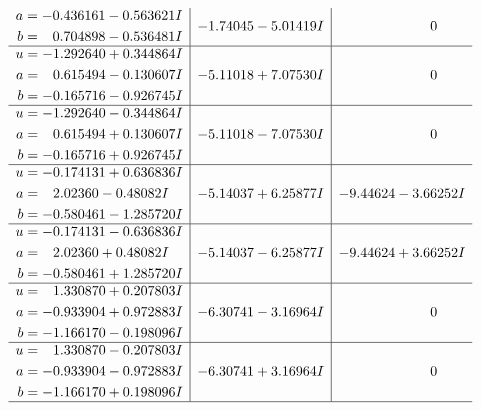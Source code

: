 \documentclass[1p]{elsarticle_modified}
\theoremstyle{definition}
\begin{document}
$$\begin{array}{c|c|c}
\begin{aligned}
a &= -0.436161 - 0.563621 I \\
b &= \phantom{-}0.704898 - 0.536481 I\end{aligned}
 & -1.74045 - 5.01419 I & \phantom{-0.000000 } 0 \\ \hline\begin{aligned}
u &= -1.292640 + 0.344864 I \\
a &= \phantom{-}0.615494 - 0.130607 I \\
b &= -0.165716 - 0.926745 I\end{aligned}
 & -5.11018 + 7.07530 I & \phantom{-0.000000 } 0 \\ \hline\begin{aligned}
u &= -1.292640 - 0.344864 I \\
a &= \phantom{-}0.615494 + 0.130607 I \\
b &= -0.165716 + 0.926745 I\end{aligned}
 & -5.11018 - 7.07530 I & \phantom{-0.000000 } 0 \\ \hline\begin{aligned}
u &= -0.174131 + 0.636836 I \\
a &= \phantom{-}2.02360 - 0.48082 I \\
b &= -0.580461 - 1.285720 I\end{aligned}
 & -5.14037 + 6.25877 I & -9.44624 - 3.66252 I \\ \hline\begin{aligned}
u &= -0.174131 - 0.636836 I \\
a &= \phantom{-}2.02360 + 0.48082 I \\
b &= -0.580461 + 1.285720 I\end{aligned}
 & -5.14037 - 6.25877 I & -9.44624 + 3.66252 I \\ \hline\begin{aligned}
u &= \phantom{-}1.330870 + 0.207803 I \\
a &= -0.933904 + 0.972883 I \\
b &= -1.166170 - 0.198096 I\end{aligned}
 & -6.30741 - 3.16964 I & \phantom{-0.000000 } 0 \\ \hline\begin{aligned}
u &= \phantom{-}1.330870 - 0.207803 I \\
a &= -0.933904 - 0.972883 I \\
b &= -1.166170 + 0.198096 I\end{aligned}
 & -6.30741 + 3.16964 I & \phantom{-0.000000 } 0\\
 \hline 
 \end{array}$$\newpage$$\begin{array}{c|c|c}  

\end{array}$$
\end{document}
